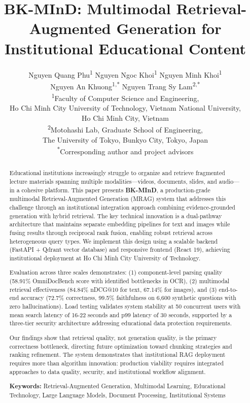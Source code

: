 \documentclass[11pt,a4paper,twocolumn]{article}
\title{\textbf{BK-MInD: Multimodal Retrieval-Augmented Generation for Institutional Educational Content}}
\author{
    Nguyen Quang Phu\textsuperscript{1} \quad Nguyen Ngoc Khoi\textsuperscript{1} \quad Nguyen Minh Khoi\textsuperscript{1}\\
    Nguyen An Khuong\textsuperscript{1,*} \quad Nguyen Trang Sy Lam\textsuperscript{2,*}\\
    \textsuperscript{1}Faculty of Computer Science and Engineering,\\
    Ho Chi Minh City University of Technology, Vietnam National University,\\
    Ho Chi Minh City, Vietnam\\
    \textsuperscript{2}Motohashi Lab, Graduate School of Engineering,\\
    The University of Tokyo, Bunkyo City, Tokyo, Japan\\
    \textsuperscript{*}Corresponding author and project advisors
}
\date{}
\begin{document}
\onecolumn
\maketitle

\begin{abstract}
Educational institutions increasingly struggle to organize and retrieve fragmented lecture materials spanning multiple modalities—videos, documents, slides, and audio—in a cohesive platform. This paper presents \textbf{BK-MInD}, a production-grade multimodal Retrieval-Augmented Generation (MRAG) system that addresses this challenge through an institutional integration approach combining evidence-grounded generation with hybrid retrieval. The key technical innovation is a dual-pathway architecture that maintains separate embedding pipelines for text and images while fusing results through reciprocal rank fusion, enabling robust retrieval across heterogeneous query types. We implement this design using a scalable backend (FastAPI + Qdrant vector database) and responsive frontend (React 19), achieving institutional deployment at Ho Chi Minh City University of Technology.

Evaluation across three scales demonstrates: (1) component-level parsing quality (58.91\% OmniDocBench score with identified bottlenecks in OCR), (2) multimodal retrieval effectiveness (84.84\% nDCG@10 for text, 67.14\% for images), and (3) end-to-end accuracy (72.7\% correctness, 99.5\% faithfulness on 6,600 synthetic questions with zero hallucinations). Load testing validates system stability at 50 concurrent users with mean search latency of 16-22 seconds and p99 latency of 30 seconds, supported by a three-tier security architecture addressing educational data protection requirements.

Our findings show that retrieval quality, not generation quality, is the primary correctness bottleneck, directing future optimization toward chunking strategies and ranking refinement. The system demonstrates that institutional RAG deployment requires more than algorithm innovation: production viability requires integrated approaches to data quality, security, and institutional workflow alignment.

\textbf{Keywords:} Retrieval-Augmented Generation, Multimodal Learning, Educational Technology, Large Language Models, Document Processing, Institutional Systems
\end{abstract}
\end{document}
